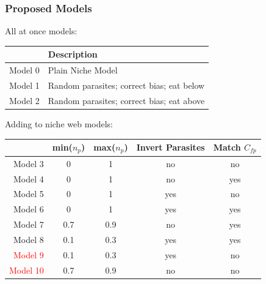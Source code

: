 \documentclass{beamer}
\begin{document}
\begin{frame}
\frametitle{Proposed Models}
All at once models:
\begin{tabular}{|r |l|}
\hline
&Description\\
\hline
Model 0& Plain Niche Model\\
Model 1& Random parasites; correct bias; eat below\\
Model 2& Random parasites; correct bias; eat above\\
\hline
\end{tabular}

Adding to niche web models:
\begin{tabular}{|r|c c c c|}
\hline
&min($n_p$)&max($n_p$)&Invert Parasites&Match $C_{fp}$\\
\hline
Model 3 & 0 & 1 & no & no\\
Model 4 & 0 & 1 & no & yes\\
Model 5 & 0 & 1 & yes & no\\
Model 6 & 0 & 1 & yes & yes\\
Model 7 & 0.7 & 0.9 & no & yes\\
Model 8 & 0.1 & 0.3 & yes & yes\\
\textcolor{red}{Model 9} & 0.1 & 0.3 & yes & no\\
\textcolor{red}{Model 10} & 0.7 & 0.9 & no & no\\
\hline
\end{tabular} 
\end{frame}
\end{document}

